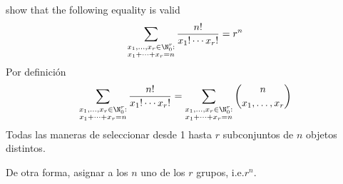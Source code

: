 \item show that the following equality is valid
\[ 
\sum_{\substack{x_1,\dots,x_r\in\N_0^r:\\
x_1+\dots+x_r=n}} \frac{n!}{x_1! \cdots x_r!} = r^n
\]
Por definición
\[ \sum_{\substack{x_1,\dots,x_r\in\N_0^r:\\
    x_1+\dots+x_r=n}} \frac{n!}{x_1! \cdots x_r!}
    = \sum_{\substack{x_1,\dots,x_r\in\N_0^r:\\
    x_1+\dots+x_r=n}} \binom{n}{x_1,\dots,x_r} 
\]
Todas las maneras de seleccionar desde 1 hasta $r$ subconjuntos de $n$ objetos distintos.

De otra forma, asignar a los $n$ uno de los $r$ grupos, i.e.\@ $r^n$.